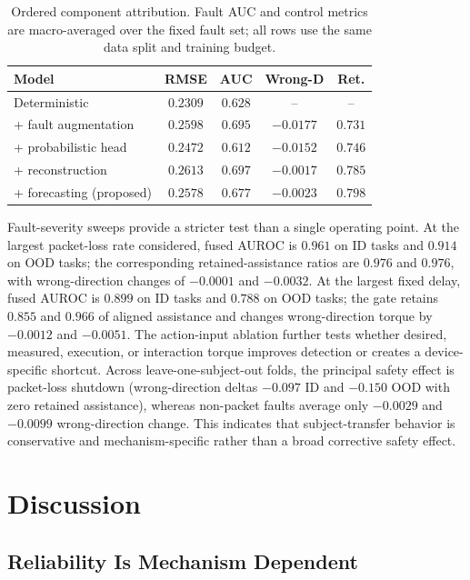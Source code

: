 \documentclass[letterpaper]{article} %
\begin{document}
\begin{table}[t]
\centering
\scriptsize
\setlength{\tabcolsep}{3pt}
\begin{tabular}{lcccc}
\toprule
Model & RMSE & AUC & Wrong-D & Ret.\\
\midrule
Deterministic & $0.2309$ & $0.628$ & -- & --\\
+ fault augmentation & $0.2598$ & $0.695$ & $-0.0177$ & $0.731$\\
+ probabilistic head & $0.2472$ & $0.612$ & $-0.0152$ & $0.746$\\
+ reconstruction & $0.2613$ & $0.697$ & $-0.0017$ & $0.785$\\
+ forecasting (proposed) & $0.2578$ & $0.677$ & $-0.0023$ & $0.798$\\
\bottomrule
\end{tabular}
\caption{Ordered component attribution. Fault AUC and control metrics are macro-averaged over the fixed fault set; all rows use the same data split and training budget.}
\label{tab:ablation}
\end{table}

Fault-severity sweeps provide a stricter test than a single operating point.
At the largest packet-loss rate considered, fused AUROC is $0.961$ on ID tasks and $0.914$ on OOD tasks; the corresponding retained-assistance ratios are $0.976$ and $0.976$, with wrong-direction changes of $-0.0001$ and $-0.0032$.
At the largest fixed delay, fused AUROC is $0.899$ on ID tasks and $0.788$ on OOD tasks; the gate retains $0.855$ and $0.966$ of aligned assistance and changes wrong-direction torque by $-0.0012$ and $-0.0051$.
The action-input ablation further tests whether desired, measured, execution, or interaction torque improves detection or creates a device-specific shortcut.
Across leave-one-subject-out folds, the principal safety effect is packet-loss shutdown (wrong-direction deltas $-0.097$ ID and $-0.150$ OOD with zero retained assistance), whereas non-packet faults average only $-0.0029$ and $-0.0099$ wrong-direction change.
This indicates that subject-transfer behavior is conservative and mechanism-specific rather than a broad corrective safety effect.

\section{Discussion}

\subsection{Reliability Is Mechanism Dependent}
\end{document}
